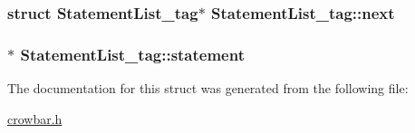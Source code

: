 \subsubsection[{next}]{\setlength{\rightskip}{0pt plus 5cm}struct {\bf Statement\+List\+\_\+tag}$\ast$ Statement\+List\+\_\+tag\+::next}\label{struct_statement_list__tag_a1e3b82b453a9f9d654c0d6b5313009be}
\hypertarget{struct_statement_list__tag_af8e00b3cdbd4364e5c5c23896df4697d}{}
\subsubsection[{statement}]{$\ast$ Statement\+List\+\_\+tag\+::statement}\label{struct_statement_list__tag_af8e00b3cdbd4364e5c5c23896df4697d}


The documentation for this struct was generated from the following file\+:\begin{DoxyCompactItemize}
\item 
\hyperlink{crowbar_8h}{crowbar.\+h}\end{DoxyCompactItemize}
